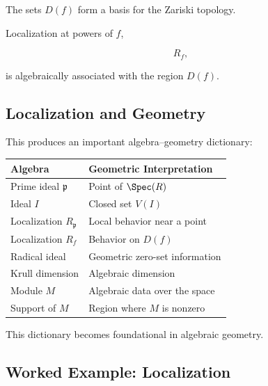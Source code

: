 The sets \(D(f)\) form a basis for the Zariski topology.

Localization at powers of \(f\),

\[ R_f, \]

is algebraically associated with the region \(D(f)\).

\subsection{Localization and Geometry}
\label{subsec:localization-and-geometry}

This produces an important algebra--geometry dictionary:

\begin{center}
\begin{tabularx}{0.9\textwidth}{@{}XX@{}}
\toprule
\textbf{Algebra} & \textbf{Geometric Interpretation}\\
\midrule
Prime ideal \(\mathfrak p\) & Point of \(\Spec(R)\)\\
Ideal \(I\) & Closed set \(V(I)\)\\
Localization \(R_{\mathfrak p}\) & Local behavior near a point\\
Localization \(R_f\) & Behavior on \(D(f)\)\\
Radical ideal & Geometric zero-set information\\
Krull dimension & Algebraic dimension\\
Module \(M\) & Algebraic data over the space\\
Support of \(M\) & Region where \(M\) is nonzero\\
\bottomrule
\end{tabularx}
\end{center}

This dictionary becomes foundational in algebraic geometry.

\subsection{Worked Example: Localization}
\label{subsec:worked-localization}

